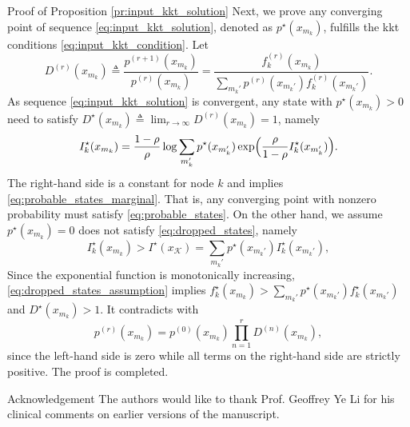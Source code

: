 \documentclass[journal]{IEEEtran}
\begin{document}
\begin{appendix}
\begin{subsection}{Proof of Proposition \ref{pr:input_kkt_solution}}
		Next, we prove any converging point of sequence \eqref{eq:input_kkt_solution}, denoted as $p^\star(x_{m_k})$, fulfills the \gls{kkt} conditions \eqref{eq:input_kkt_condition}.
		Let
		\begin{equation}
			D^{(r)}(x_{m_k}) \triangleq \frac{p^{(r+1)}(x_{m_k})}{p^{(r)}(x_{m_k})} = \frac{f_k^{(r)}(x_{m_k})}{\sum_{m_k'} p^{(r)}(x_{m_k'}) f_k^{(r)}(x_{m_k'})}.
		\end{equation}
		As sequence \eqref{eq:input_kkt_solution} is convergent, any state with $p^\star(x_{m_k}) > 0$ need to satisfy $D^\star(x_{m_k}) \triangleq \lim_{r \to \infty} D^{(r)}(x_{m_k}) = 1$, namely
		\begin{equation}
			I_k^\star(x_{m_k}) = \frac{1 - \rho}{\rho} \log \sum_{m_k'} p^\star(x_{m_k'}) \exp \Bigl( \frac{\rho}{1 - \rho} I_k^\star(x_{m_k'}) \Bigr).
		\end{equation}
		The right-hand side is a constant for node $k$ and implies \eqref{eq:probable_states_marginal}.
		That is, any converging point with nonzero probability must satisfy \eqref{eq:probable_states}.
		On the other hand, we assume $p^\star(x_{m_k}) = 0$ does not satisfy \eqref{eq:dropped_states}, namely
		\begin{equation}
			I_k^\star(x_{m_k}) > I^\star(x_{\mathcal{K}}) = \sum_{m_k'} p^\star(x_{m_k'}) I_k^\star(x_{m_k'}),
			\label{eq:dropped_states_assumption}
		\end{equation}
		Since the exponential function is monotonically increasing, \eqref{eq:dropped_states_assumption} implies $f_k^\star(x_{m_k}) > \sum_{m_k'} p^\star(x_{m_k'}) f_k^\star(x_{m_k'})$ and $D^\star(x_{m_k}) > 1$.
		It contradicts with
		\begin{equation}
			p^{(r)}(x_{m_k}) = p^{(0)}(x_{m_k}) \prod_{n=1}^r D^{(n)}(x_{m_k}),
		\end{equation}
		since the left-hand side is zero while all terms on the right-hand side are strictly positive.
		The proof is completed.
		\label{ap:input_kkt_solution}
	\end{subsection}
\end{appendix}

\begin{section}{Acknowledgement}
	The authors would like to thank Prof. Geoffrey Ye Li for his clinical comments on earlier versions of the manuscript.
\end{section}




\end{document}
